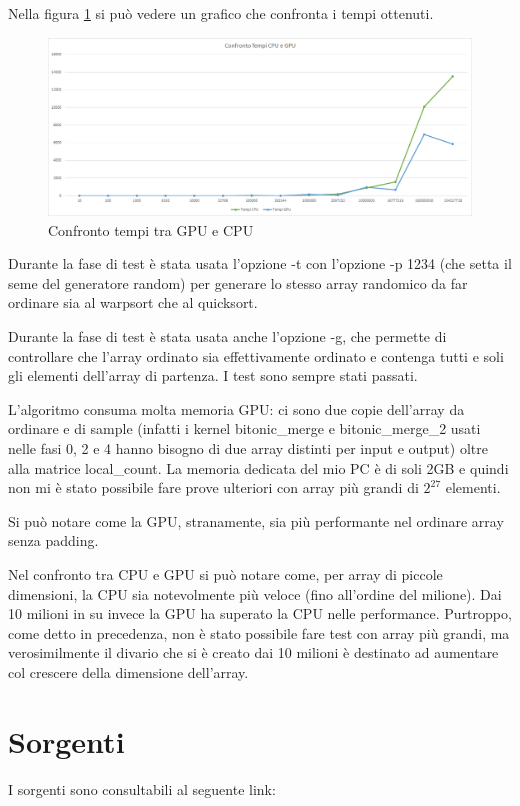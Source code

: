 \documentclass[a4paper, 11pt]{article}
\begin{document}
		Nella figura \ref{fig:confrontotempi} si può vedere un grafico che confronta i tempi ottenuti.
		
		\begin{figure}
			\centering
			\includegraphics[width=0.99\linewidth]{img/ConfrontoTempi}
			\caption{Confronto tempi tra GPU e CPU}
			\label{fig:confrontotempi}
		\end{figure}
		
		Durante la fase di test è stata usata l'opzione -t con l'opzione -p 1234 (che setta il seme del generatore random) 
		per generare lo stesso array randomico da far ordinare sia al warpsort che al quicksort.
		
		Durante la fase di test è stata usata anche l'opzione -g, che permette di controllare che l'array ordinato sia effettivamente ordinato
		e contenga tutti e soli gli elementi dell'array di partenza. I test sono sempre stati passati.
		
		L'algoritmo consuma molta memoria GPU: ci sono due copie dell'array da ordinare e di sample 
		(infatti i kernel bitonic\_merge e bitonic\_merge\_2 usati nelle fasi 0, 2 e 4 hanno bisogno di due array distinti per input e output)
		oltre alla matrice local\_count.
		La memoria dedicata del mio PC è di soli 2GB e quindi non mi è stato possibile fare prove ulteriori 
		con array più grandi di $2^{27}$ elementi.
		
		Si può notare come la GPU, stranamente, sia più performante nel ordinare array senza padding.
		
		Nel confronto tra CPU e GPU si può notare come, per array di piccole dimensioni, la CPU sia notevolmente più veloce (fino all'ordine del 
		milione). Dai 10 milioni in su invece la GPU ha superato la CPU nelle performance. Purtroppo, come detto in precedenza, non è stato 
		possibile fare 
		test con array più grandi, ma verosimilmente il divario che si è creato dai 10 milioni è destinato ad aumentare col crescere 
		della dimensione dell'array.
	\section{Sorgenti}
		\label{sorgenti}
		I sorgenti sono consultabili al seguente link: %
		
	\newpage
	\printbibliography		
\end{document}
